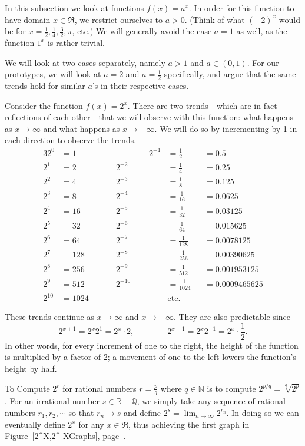 In this subsection we look at functions $f(x)=a^x$.  
In order for this function to have domain $x\in\Re$, we
restrict ourselves to $a>0$.  (Think of what
$(-2)^x$ would be for $x=\frac12,\frac14,\frac32,\pi$, etc.)
We will generally avoid the case $a=1$ as well, as the
function $1^x$ is rather trivial.

We will look at two cases separately, namely $a>1$ and $a\in(0,1)$.
For our prototypes, we will look at $a=2$ and $a=\frac12$ specifically,
and argue that the same trends hold for similar $a$'s in their
respective cases.

\begin{example}  Consider the function $f(x)=2^x$.  There are
two trends---which are in fact reflections of each other---that we will
observe with this function:  what happens as $x\to\infty$
and what happens as $x\to-\infty$.  We will do so by incrementing
by 1 in each direction to observe the trends.
\begin{alignat*}{3}
2^0&= 1\qquad\qquad&\qquad\qquad2^{-1} &=\frac12&&=0.5\\
2^1&= 2&2^{-2}&=\frac14&&=0.25\\
2^2&= 4&2^{-3}&=\frac18&&=0.125\\
2^3&= 8&2^{-4}&=\frac1{16}&&=0.0625\\
2^4&= 16&2^{-5}&=\frac1{32}&&=0.03125\\
2^5&= 32&2^{-6}&=\frac1{64}&&=0.015625\\
2^6&= 64&2^{-7}&=\frac1{128}&&=0.0078125\\
2^7&= 128&2^{-8}&=\frac1{256}&&=0.00390625\\
2^8&= 256&2^{-9}&=\frac1{512}&&=0.001953125\\
2^9&= 512&2^{-10}&=\frac1{1024}&&=0.0009465625\\
2^{10}&= 1024&&\text{etc.}
\end{alignat*}

These trends continue as $x\to\infty$ and $x\to-\infty$.
They are also predictable since
$$2^{x+1}=2^x2^1=2^x\cdot2,\qquad\qquad 2^{x-1}=2^x2^{-1}=2^x\cdot\frac12.$$
In other words, for every increment of one to the right, the height of 
the function is multiplied by a factor of 2; a movement of one to the 
left lowers the function's height by half.

To Compute $2^r$ for rational numbers $r=\frac{p}q$
where $q\in\mathbb{N}$
is to compute $2^{p/q}=\sqrt[q]{2^p}$.  For an irrational number
$s\in\mathbb{R}-\mathbb{Q}$, we simply take any sequence
of rational numbers $r_1,r_2,\cdots$ so that $r_n\longrightarrow s$
and define $2^s=\lim_{n\to\infty}2^{r_n}$.  In doing so we
can eventually define $2^x$ for any $x\in\Re$, thus achieving
the first graph in  Figure~\ref{2^X,2^-XGraphs}, 
page~\pageref{2^X,2^-XGraphs}. 
\label{NeedPageForIrrationalPowersOfAExplained}
\end{example}
